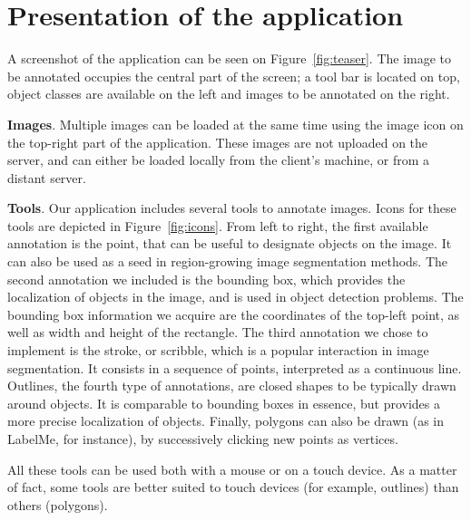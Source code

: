 \section{Presentation of the application}

A screenshot of the application can be seen on Figure~\ref{fig:teaser}.
The image to be annotated occupies the central part of the screen;
a tool bar is located on top, object classes are available on the left
and images to be annotated on the right.


\textbf{Images}.
Multiple images can be loaded at the same time using the image icon
on the top-right part of the application.
These images are not uploaded on the server,
and can either be loaded locally from the client's machine,
or from a distant server.
% 
% 


\textbf{Tools}.
Our application includes several tools to annotate images.
Icons for these tools are depicted in Figure~\ref{fig:icons}.
From left to right, the first available annotation is the point,
that can be useful to designate objects on the image.
It can also be used as a seed in region-growing image segmentation methods.
The second annotation we included is the bounding box,
which provides the localization of objects in the image,
and is used in object detection problems.
The bounding box information we acquire are the coordinates of the top-left point,
as well as width and height of the rectangle.
% 
% 
The third annotation we chose to implement is the stroke,
or scribble, which is a popular interaction in image segmentation.
It consists in a sequence of points, interpreted as a continuous line.
Outlines, the fourth type of annotations,
are closed shapes to be typically drawn around objects.
It is comparable to bounding boxes in essence,
but provides a more precise localization of objects.
Finally, polygons can also be drawn (as in LabelMe, for instance),
by successively clicking new points as vertices.


All these tools can be used both with a mouse or on a touch device.
% 
% 
As a matter of fact, some tools are better suited to touch devices
(for example, outlines) than others (polygons).

